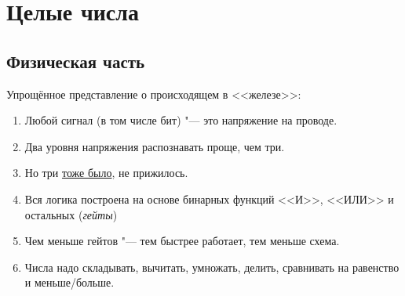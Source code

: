 \section{Целые числа}
\subsection{Физическая часть}

\begin{frame}
\end{frame}

\begin{frame}
	Упрощённое представление о происходящем в <<железе>>:
	\begin{enumerate}
		\item Любой сигнал (в том числе бит) "--- это напряжение на проводе.
		\item Два уровня напряжения распознавать проще, чем три.
		\item Но три \href{https://ru.wikipedia.org/wiki/\%D0\%A1\%D0\%B5\%D1\%82\%D1\%83\%D0\%BD\%D1\%8C\_(\%D0\%BA\%D0\%BE\%D0\%BC\%D0\%BF\%D1\%8C\%D1\%8E\%D1\%82\%D0\%B5\%D1\%80)}{тоже было}, не прижилось.
		\item Вся логика построена на основе бинарных функций <<И>>, <<ИЛИ>> и остальных (\textit{гейты})
		\item Чем меньше гейтов "--- тем быстрее работает, тем меньше схема.
		\item Числа надо складывать, вычитать, умножать, делить, сравнивать на равенство и меньше/больше.
	\end{enumerate}
\end{frame}

